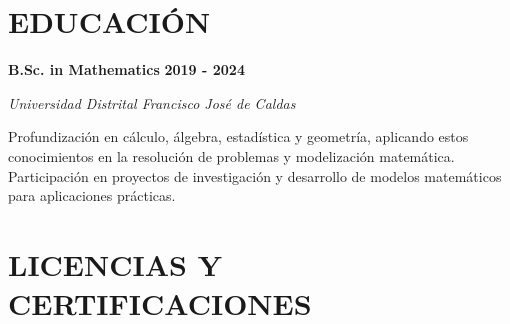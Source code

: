 \documentclass[paper=a4,fontsize=11pt]{scrartcl} %
\newcommand{\sepspace}{\vspace*{0.8em}}
\newcommand{\NewPart}[1]{\section*{\uppercase{#1}}}
\newcommand{\EducationEntry}[4]{%
  \noindent \textbf{#1} \hfill \textbf{#2} \par
  \noindent \textit{#3} \par
  \noindent \small #4 
  \normalsize \par \sepspace
}
\begin{document}
\sepspace

\NewPart{Educación}

\EducationEntry{B.Sc. in Mathematics}{2019 - 2024}{Universidad Distrital Francisco José de Caldas}{%
Profundización en cálculo, álgebra, estadística y geometría, aplicando estos conocimientos en la resolución de problemas y modelización matemática. Participación en proyectos de investigación y desarrollo de modelos matemáticos para aplicaciones prácticas.
}

\sepspace

\NewPart{Licencias y Certificaciones}
\end{document}
